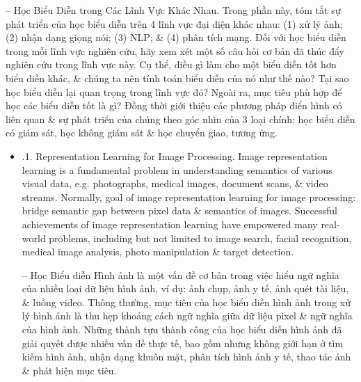 \documentclass{article}
\begin{document}
\begin{itemize}
\begin{itemize}
        -- {\sf Học Biểu Diễn trong Các Lĩnh Vực Khác Nhau.} Trong phần này, tóm tắt sự phát triển của học biểu diễn trên 4 lĩnh vực đại diện khác nhau: (1) xử lý ảnh; (2) nhận dạng giọng nói; (3) NLP; \& (4) phân tích mạng. Đối với học biểu diễn trong mỗi lĩnh vực nghiên cứu, hãy xem xét một số câu hỏi cơ bản đã thúc đẩy nghiên cứu trong lĩnh vực này. Cụ thể, điều gì làm cho một biểu diễn tốt hơn biểu diễn khác, \& chúng ta nên tính toán biểu diễn của nó như thế nào? Tại sao học biểu diễn lại quan trọng trong lĩnh vực đó? Ngoài ra, mục tiêu phù hợp để học các biểu diễn tốt là gì? Đồng thời giới thiệu các phương pháp điển hình có liên quan \& sự phát triển của chúng theo góc nhìn của 3 loại chính: học biểu diễn có giám sát, học không giám sát \& học chuyển giao, tương ứng.
        \begin{itemize}
            \item {.1. Representation Learning for Image Processing.} Image representation learning is a fundamental problem in understanding semantics of various visual data, e.g. photographs, medical images, document scans, \& video streams. Normally, goal of image representation learning for image processing: bridge semantic gap between pixel data \& semantics of images. Successful achievements of image representation learning have empowered many real-world problems, including but not limited to image search, facial recognition, medical image analysis, photo manipulation \& target detection.

            -- Học Biểu diễn Hình ảnh là một vấn đề cơ bản trong việc hiểu ngữ nghĩa của nhiều loại dữ liệu hình ảnh, ví dụ: ảnh chụp, ảnh y tế, ảnh quét tài liệu, \& luồng video. Thông thường, mục tiêu của học biểu diễn hình ảnh trong xử lý hình ảnh là thu hẹp khoảng cách ngữ nghĩa giữa dữ liệu pixel \& ngữ nghĩa của hình ảnh. Những thành tựu thành công của học biểu diễn hình ảnh đã giải quyết được nhiều vấn đề thực tế, bao gồm nhưng không giới hạn ở tìm kiếm hình ảnh, nhận dạng khuôn mặt, phân tích hình ảnh y tế, thao tác ảnh \& phát hiện mục tiêu.


\end{itemize}
\end{itemize}
\end{itemize}
\end{document}
